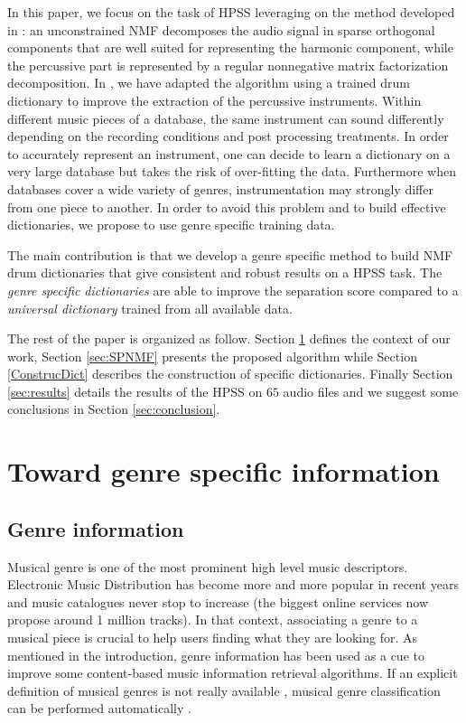 \documentclass{article}
\begin{document}
In this paper, we focus on the task of HPSS leveraging on the method developed in \cite{laroche2015structuredhidden}: an unconstrained NMF decomposes the audio signal in sparse orthogonal components that are well suited for representing the harmonic component, while the percussive part is represented by a regular nonnegative matrix factorization decomposition. In \cite{larocheJournalhidden}, we have adapted the algorithm using a trained drum dictionary to improve the extraction of the percussive instruments. Within different music pieces of a database, the same instrument can sound differently depending on the recording conditions and post processing treatments. In order to accurately represent an instrument, one can decide to learn a dictionary on a very large database but takes the risk of over-fitting the data. Furthermore when databases cover a wide variety of genres, instrumentation may strongly differ from one piece to another. In order to avoid this problem and to build effective dictionaries, we propose to use genre specific training data.

The main contribution is that we develop a genre specific method to build NMF drum dictionaries that give consistent and robust results on a HPSS task. The \emph{genre specific dictionaries} are able to improve the separation score compared to a \emph{universal dictionary} trained from all available data. 


The rest of the paper is organized as follow. Section \ref{defgenre} defines the context of our work, Section \ref{sec:SPNMF} presents the proposed algorithm while Section \ref{ConstrucDict} describes the construction of specific dictionaries. Finally Section \ref{sec:results} details the results of the HPSS on $65$ audio files and  we suggest some conclusions in Section \ref{sec:conclusion}. 



\section{Toward genre specific information}\label{defgenre}

\subsection{Genre information}

Musical genre is one of the most prominent high level music descriptors. Electronic Music Distribution has become more and more popular in recent years and music catalogues never stop to increase (the biggest online services now propose around 1 million tracks). In that context, associating a genre to a musical piece is crucial to help users finding what they are looking for. As mentioned in the introduction, genre information has been used as a cue to improve some content-based music information retrieval algorithms. If an explicit definition of musical genres is not really available \cite{aucouturier2003representing}, musical genre classification can be performed automatically \cite{li2003comparative}. %
\end{document}
